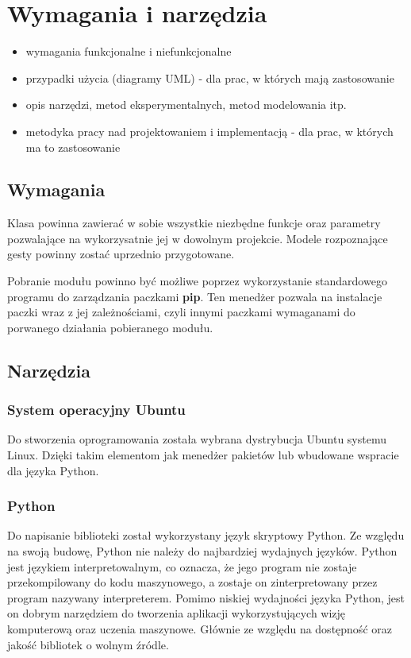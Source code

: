 \chapter{Wymagania i narzędzia}

\begin{itemize}
\item wymagania funkcjonalne i niefunkcjonalne
\item przypadki użycia (diagramy UML) - dla prac, w których mają zastosowanie
\item opis narzędzi, metod eksperymentalnych, metod modelowania itp.
\item metodyka pracy nad projektowaniem i implementacją - dla prac, w których ma to zastosowanie
\end{itemize}


\section{Wymagania}

\quad Klasa powinna zawierać w sobie wszystkie niezbędne funkcje oraz parametry pozwalające na wykorzysatnie jej w dowolnym projekcie. Modele rozpoznające gesty powinny zostać uprzednio przygotowane. 

\quad Pobranie modułu powinno być możliwe poprzez wykorzystanie standardowego programu do zarządzania paczkami \textbf{pip}. Ten menedżer pozwala na instalacje paczki wraz z jej zależnościami, czyli innymi paczkami wymaganami do porwanego działania pobieranego modułu. 

\section{Narzędzia}

\subsection{System operacyjny Ubuntu}
\quad Do stworzenia oprogramowania została wybrana dystrybucja Ubuntu systemu Linux. Dzięki takim elementom jak menedżer pakietów lub wbudowane wspracie dla języka Python.

\subsection{Python}
\quad Do napisanie biblioteki został wykorzystany język skryptowy Python. Ze względu na swoją budowę, Python nie należy do najbardziej wydajnych języków. Python jest językiem interpretowalnym, co oznacza, że jego program nie zostaje przekompilowany do kodu maszynowego, a zostaje on zinterpretowany przez program nazywany interpreterem. 
\quad Pomimo niskiej wydajności języka Python, jest on dobrym narzędziem do tworzenia aplikacji wykorzystujących wizję komputerową oraz uczenia maszynowe. Głównie ze względu na dostępność oraz jakość bibliotek o wolnym źródle.  

